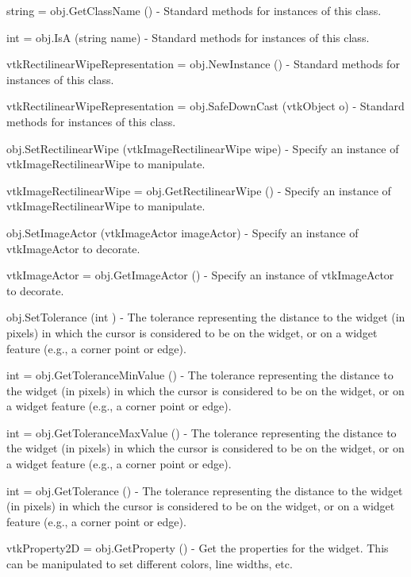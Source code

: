 \begin{DoxyItemize}
\item {\ttfamily string = obj.\-Get\-Class\-Name ()} -\/ Standard methods for instances of this class.  
\item {\ttfamily int = obj.\-Is\-A (string name)} -\/ Standard methods for instances of this class.  
\item {\ttfamily vtk\-Rectilinear\-Wipe\-Representation = obj.\-New\-Instance ()} -\/ Standard methods for instances of this class.  
\item {\ttfamily vtk\-Rectilinear\-Wipe\-Representation = obj.\-Safe\-Down\-Cast (vtk\-Object o)} -\/ Standard methods for instances of this class.  
\item {\ttfamily obj.\-Set\-Rectilinear\-Wipe (vtk\-Image\-Rectilinear\-Wipe wipe)} -\/ Specify an instance of vtk\-Image\-Rectilinear\-Wipe to manipulate.  
\item {\ttfamily vtk\-Image\-Rectilinear\-Wipe = obj.\-Get\-Rectilinear\-Wipe ()} -\/ Specify an instance of vtk\-Image\-Rectilinear\-Wipe to manipulate.  
\item {\ttfamily obj.\-Set\-Image\-Actor (vtk\-Image\-Actor image\-Actor)} -\/ Specify an instance of vtk\-Image\-Actor to decorate.  
\item {\ttfamily vtk\-Image\-Actor = obj.\-Get\-Image\-Actor ()} -\/ Specify an instance of vtk\-Image\-Actor to decorate.  
\item {\ttfamily obj.\-Set\-Tolerance (int )} -\/ The tolerance representing the distance to the widget (in pixels) in which the cursor is considered to be on the widget, or on a widget feature (e.\-g., a corner point or edge).  
\item {\ttfamily int = obj.\-Get\-Tolerance\-Min\-Value ()} -\/ The tolerance representing the distance to the widget (in pixels) in which the cursor is considered to be on the widget, or on a widget feature (e.\-g., a corner point or edge).  
\item {\ttfamily int = obj.\-Get\-Tolerance\-Max\-Value ()} -\/ The tolerance representing the distance to the widget (in pixels) in which the cursor is considered to be on the widget, or on a widget feature (e.\-g., a corner point or edge).  
\item {\ttfamily int = obj.\-Get\-Tolerance ()} -\/ The tolerance representing the distance to the widget (in pixels) in which the cursor is considered to be on the widget, or on a widget feature (e.\-g., a corner point or edge).  
\item {\ttfamily vtk\-Property2\-D = obj.\-Get\-Property ()} -\/ Get the properties for the widget. This can be manipulated to set different colors, line widths, etc.  

\end{DoxyItemize}
